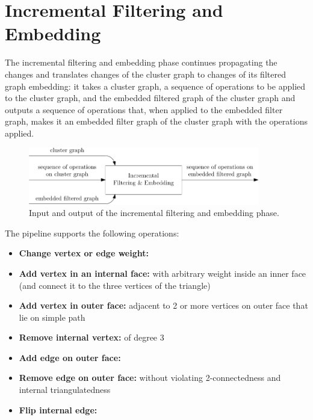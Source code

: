 \section{Incremental Filtering and Embedding}
\label{sect:incremental-filtering-and-embedding}

The incremental filtering and embedding phase continues propagating the changes and translates changes of the cluster graph to changes of its filtered graph embedding: it takes a cluster graph, a sequence of operations to be applied to the cluster graph, and the embedded filtered graph of the cluster graph and outputs a sequence of operations that, when applied to the embedded filter graph, makes it an embedded filter graph of the cluster graph with the operations applied.

\begin{figure}[H]
	\centering\includegraphics[width=0.9\textwidth]{Resources/DynamicPipeline-IncrementalFilteringAndEmbedding.pdf}
	\caption{Input and output of the incremental filtering and embedding phase.}
	\label{fig:dynamic-pipeline-incremental-filtering-and-embedding}
\end{figure}

The pipeline supports the following operations:
%
\begin{itemize}
	\item \textbf{Change vertex or edge weight:}
	\item \textbf{Add vertex in an internal face:} with arbitrary weight inside an inner face (and connect it to the three vertices of the triangle)
	\item \textbf{Add vertex in outer face:} adjacent to 2 or more vertices on outer face that lie on simple path
	\item \textbf{Remove internal vertex:} of degree 3
	\item \textbf{Add edge on outer face:}
	\item \textbf{Remove edge on outer face:} without violating 2-connectedness and internal triangulatedness
	\item \textbf{Flip internal edge:}
\end{itemize}
